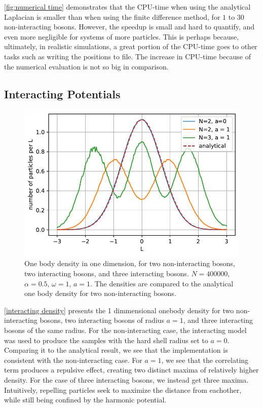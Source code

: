 \autoref{fig:numerical time} demonstrates that the CPU-time when using the analytical Laplacian is smaller than when using the finite difference method, for $1$ to $30$ non-interacting bosons. However, the speedup is small and hard to quantify, and even more negligible for systems of more particles. This is perhaps because, ultimately, in realistic simulations, a great portion of the CPU-time goes to other tasks such as writing the positions to file. The increase in CPU-time because of the numerical evaluation is not so big in comparison.    
\subsection{Interacting Potentials}
\begin{figure}
	\includegraphics[width=.8\linewidth]{figures/interactingDensity.pdf}
	\centering
	\caption{One body density in one dimension, for two non-interacting bosons, two interacting bosons, and three interacting bosons. $N = 400000$, $\alpha = 0.5$, $\omega = 1$, $a = 1$. The densities are compared to the analytical one body density for two non-interacting bosons.}
	\label{fig:interacting density}
\end{figure}

\autoref{interacting density} presents the 1 dimmensional onebody density for two non-interacting bosons, two interacting bosons of radius $a = 1$, and three interacting bosons of the same radius. 
For the non-interacting case, the interacting model was used to produce the samples with the hard shell radius set to $a = 0$. Comparing it to the analytical result, we see that the implementation is consistent with the non-interacting case. For $a=1$, we see that the correlating term produces a repulsive effect, creating two distinct maxima of relatively higher density. For the case of three interacting bosons, we instead get three maxima. Intuitively, repelling particles seek to maximize the distance from eachother, while still being confined by the harmonic potential.

